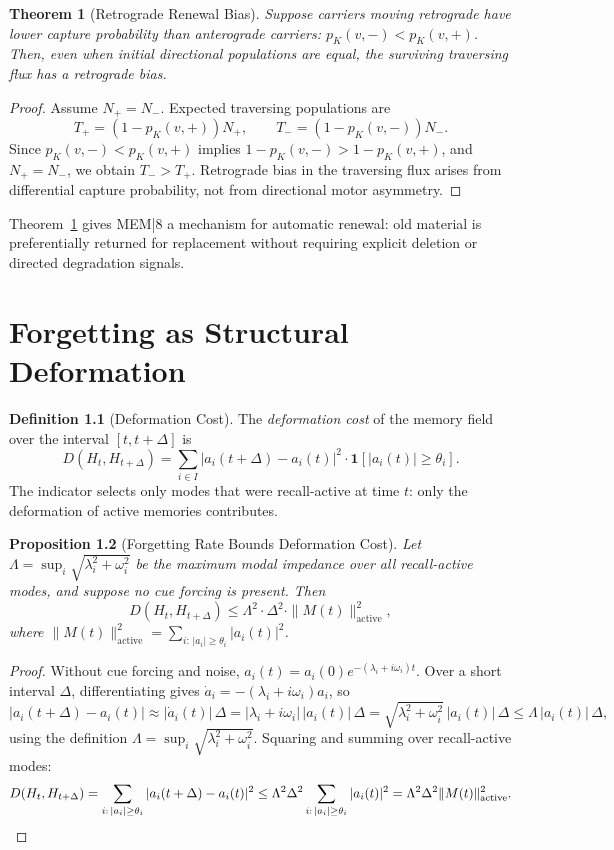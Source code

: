 \documentclass[12pt, oneside]{book}
\theoremstyle{plain}
\newtheorem{theorem}{Theorem}[chapter]
\newtheorem{proposition}[theorem]{Proposition}
\theoremstyle{definition}
\newtheorem{definition}[theorem]{Definition}
\theoremstyle{remark}
\begin{document}
\begin{theorem}[Retrograde Renewal Bias]
\label{thm:retrograde}
Suppose carriers moving retrograde have lower
capture probability than anterograde carriers:
$p_K(v,-) < p_K(v,+)$.
Then, even when initial directional populations are equal,
the surviving traversing flux has a retrograde bias.
\end{theorem}

\begin{proof}
Assume $N_+ = N_-$.
Expected traversing populations are
\[
  T_+ = (1 - p_K(v,+))N_+,
  \qquad
  T_- = (1 - p_K(v,-))N_-.
\]
Since $p_K(v,-) < p_K(v,+)$ implies
$1 - p_K(v,-) > 1 - p_K(v,+)$,
and $N_+ = N_-$, we obtain $T_- > T_+$.
Retrograde bias in the traversing flux arises from
differential capture probability, not from directional
motor asymmetry.
\end{proof}

Theorem~\ref{thm:retrograde} gives MEM|8 a mechanism for
automatic renewal: old material is preferentially returned
for replacement without requiring explicit deletion or
directed degradation signals.

\chapter{Forgetting as Structural Deformation}

\begin{definition}[Deformation Cost]
The \emph{deformation cost} of the memory field over
the interval $[t, t + \Delta]$ is
\[
  D(H_t, H_{t+\Delta})
  = \sum_{i \in I}
    \left|a_i(t+\Delta) - a_i(t)\right|^2 \cdot \mathbf{1}[|a_i(t)| \geq \theta_i].
\]
The indicator selects only modes that were recall-active
at time $t$: only the deformation of active memories
contributes.
\end{definition}

\begin{proposition}[Forgetting Rate Bounds Deformation Cost]
Let $\Lambda = \sup_i \sqrt{\lambda_i^2 + \omega_i^2}$
be the maximum modal impedance over all recall-active modes,
and suppose no cue forcing is present.
Then
\[
  D(H_t, H_{t+\Delta}) \leq \Lambda^2 \cdot \Delta^2 \cdot \|M(t)\|_{\mathrm{active}}^2,
\]
where $\|M(t)\|_{\mathrm{active}}^2 = \sum_{i:\,|a_i|\geq\theta_i} |a_i(t)|^2$.
\end{proposition}

\begin{proof}
Without cue forcing and noise, $a_i(t) = a_i(0)e^{-(\lambda_i + i\omega_i)t}$.
Over a short interval $\Delta$, differentiating gives
$\dot{a}_i = -(\lambda_i + i\omega_i)a_i$, so
\[
  |a_i(t+\Delta) - a_i(t)|
  \approx |\dot{a}_i(t)|\,\Delta
  = |\lambda_i + i\omega_i|\,|a_i(t)|\,\Delta
  = \sqrt{\lambda_i^2 + \omega_i^2}\,|a_i(t)|\,\Delta
  \leq \Lambda\,|a_i(t)|\,\Delta,
\]
using the definition $\Lambda = \sup_i\sqrt{\lambda_i^2+\omega_i^2}$.
Squaring and summing over recall-active modes:
\[
  D(H_t,H_{t+\Delta})
  = \sum_{i:\,|a_i|\geq\theta_i} |a_i(t+\Delta)-a_i(t)|^2
  \leq \Lambda^2\Delta^2 \sum_{i:\,|a_i|\geq\theta_i} |a_i(t)|^2
  = \Lambda^2\Delta^2 \|M(t)\|_{\mathrm{active}}^2. \qedhere
\]
\end{proof}
\end{document}

